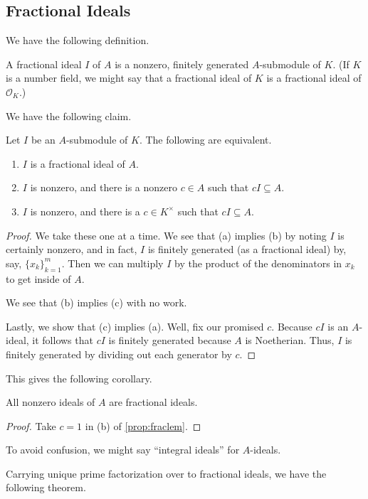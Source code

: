 \subsection{Fractional Ideals}
We have the following definition.
\begin{defi}
    A fractional ideal $I$ of $A$ is a nonzero, finitely generated $A$-submodule of $K.$ (If $K$ is a number field, we might say that a fractional ideal of $K$ is a fractional ideal of $\mathcal O_K.$)
\end{defi}
We have the following claim.
\begin{prop} \label{prop:fraclem}
    Let $I$ be an $A$-submodule of $K.$ The following are equivalent.
    \begin{enumerate}[label=(\alph*)]
        \item $I$ is a fractional ideal of $A.$
        \item $I$ is nonzero, and there is a nonzero $c\in A$ such that $cI\subseteq A.$
        \item $I$ is nonzero, and there is a $c\in K^\times$ such that $cI\subseteq A.$
    \end{enumerate}
\end{prop}
\begin{proof}
    We take these one at a time. We see that (a) implies (b) by noting $I$ is certainly nonzero, and in fact, $I$ is finitely generated (as a fractional ideal) by, say, $\{x_k\}_{k=1}^m.$ Then we can multiply $I$ by the product of the denominators in $x_k$ to get inside of $A.$

    We see that (b) implies (c) with no work.

    Lastly, we show that (c) implies (a). Well, fix our promised $c.$ Because $cI$ is an $A$-ideal, it follows that $cI$ is finitely generated because $A$ is Noetherian. Thus, $I$ is finitely generated by dividing out each generator by $c.$
\end{proof}
This gives the following corollary.
\begin{cor}
    All nonzero ideals of $A$ are fractional ideals.
\end{cor}
\begin{proof}
    Take $c=1$ in (b) of \autoref{prop:fraclem}.
\end{proof}
\begin{remark}
    To avoid confusion, we might say ``integral ideals'' for $A$-ideals.
\end{remark}
Carrying unique prime factorization over to fractional ideals, we have the following theorem.
